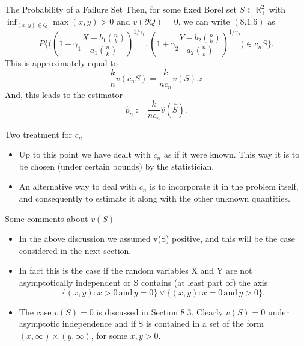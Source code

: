 \documentclass[11pt]{beamer}
\begin{document}
\begin{frame}{The Probability of a Failure Set}
Then, for some fixed Borel set $S\subset \mathbb{R}_{+}^2$ with $\inf_{(x,y)\in Q} \max(x,y)>0$ and $v(\partial Q)=0$, we can write $(8.1.6)$ as 
\begin{displaymath}
P\{ \big(    (1+\gamma_1 \dfrac{X-b_1(\frac{n}{k})}{a_1(\frac{n}{k})})^{1/\gamma_1}, (1+\gamma_2 \dfrac{Y-b_2(\frac{n}{k})}{a_2(\frac{n}{k})})^{1/\gamma_2}            \big)\in c_n S\}.
\end{displaymath}
This is approximately equal to
\begin{displaymath}
\frac{k}{n}v(c_nS)=\frac{k}{nc_n}v(S).z
\end{displaymath}
And, this leads to the estimator
\begin{displaymath}
\hat{p}_n:=\frac{k}{nc_n}\hat{v}(\hat{S}).
\end{displaymath}
\end{frame}


\begin{frame}{Two treatment for $c_n$}
\begin{itemize}
\item Up to this point we have dealt with  $c_n$ as if it were known. This way it is to be chosen (under certain bounds) by the statistician.
\vspace{4ex}
\item An alternative way to deal with $c_n$ is to incorporate it in the problem itself, and consequently to estimate it along with the other unknown quantities.
\end{itemize}
\end{frame}


\begin{frame}{Some comments about $v(S)$}
\begin{itemize}
\item In the above discussion we assumed v(S) positive, and this will be the case considered in the next section.
\item In fact this is the case
if the random variables X and Y are not asymptotically independent or S contains (at
least part of) the axis
\begin{equation}\tag{8.1.12}
\{ (x,y):x>0 \, \text{and} \, y=0\} \lor \{ (x,y):x=0 \, \text{and} \, y>0\}.
\end{equation}
\item The case $v(S)=0$ is discussed in Section 8.3. Clearly $v(S)=0$ under asymptotic
independence and if S is contained in a set of the form $(x,\infty) \times (y,\infty)$, for some $x,y>0$.
\end{itemize}
\end{frame}
\end{document}
